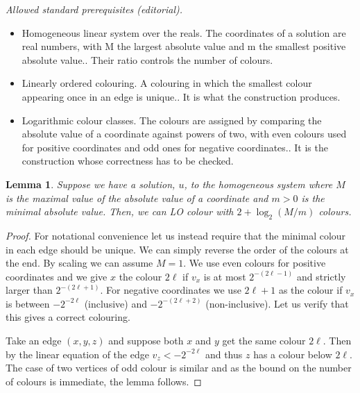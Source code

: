 \documentclass[10pt,a4paper]{article}
\theoremstyle{plain}
\newtheorem{lemma}[theorem]{Lemma}
\theoremstyle{definition}
\begin{document}
\noindent\textit{Allowed standard prerequisites (editorial).}\begin{itemize}
\item Homogeneous linear system over the reals. The coordinates of a solution are real numbers, with M the largest absolute value and m the smallest positive absolute value.. Their ratio controls the number of colours.
\item Linearly ordered colouring. A colouring in which the smallest colour appearing once in an edge is unique.. It is what the construction produces.
\item Logarithmic colour classes. The colours are assigned by comparing the absolute value of a coordinate against powers of two, with even colours used for positive coordinates and odd ones for negative coordinates.. It is the construction whose correctness has to be checked.
\end{itemize}\medskip
\begin{lemma}\label{lemma:unbal}
Suppose we have a solution, $u$, to the homogeneous system where $M$
is the maximal value of the absolute value of a coordinate
and $m > 0$ is the minimal absolute value.  Then, we can
LO colour with $2+\log_2{(M/m)}$ colours.
\end{lemma}

\begin{proof} For notational convenience let us instead require that the
minimal colour in each edge should be unique. We can simply reverse
the order of the colours at the end.  By scaling we can assume $M=1$.
We use even colours for positive coordinates and we
give $x$ the colour $2\ell$ if $v_x$ is at most $2^{-(2\ell-1)}$
and strictly larger than $2^{-(2\ell+1)}$.
For negative coordinates we use $2\ell+1$ as
the colour if $v_x$ is between $-2^{-2\ell}$ (inclusive)
and $-2^{-(2\ell+2)}$ (non-inclusive).
Let us verify that this gives a correct
colouring.

Take an edge $(x,y,z)$ and suppose both $x$ and $y$
get the same colour $2\ell$.   Then by the linear equation of the edge $v_z < -2^{-2\ell}$ and thus $z$ has a colour below $2\ell$.  The case
of two vertices of odd colour is similar and as the bound on the number of colours is immediate, the lemma follows.
\end{proof}
\end{document}
